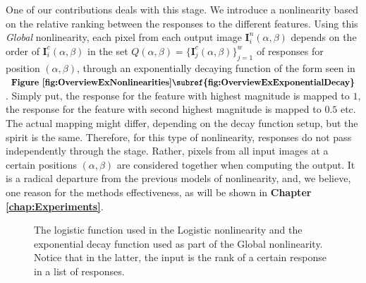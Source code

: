 \documentclass[12pt,a4paper,oneside,english]{UPBThesis}
\begin{document}
One of our contributions deals with this stage. We introduce a nonlinearity based on the relative ranking between the responses to the different features. Using this \emph{Global} nonlinearity, each pixel from each output image $\textbf{I}_i^n(\alpha,\beta)$ depends on the order of $\textbf{I}_i^c(\alpha,\beta)$ in the set $Q(\alpha,\beta) = \{\textbf{I}_j^c(\alpha,\beta)\}_{j=1}^w$ of responses for position $(\alpha,\beta)$, through an exponentially decaying function of the form seen in $\textbf{Figure \ref{fig:OverviewExNonlinearities}\subref{fig:OverviewExExponentialDecay}}$. Simply put, the response for the feature with highest magnitude is mapped to $1$, the response for the feature with second highest magnitude is mapped to $0.5$ etc. The actual mapping might differ, depending on the decay function setup, but the spirit is the same. Therefore, for this type of nonlinearity, responses do not pass independently through the stage. Rather, pixels from all input images at a certain positions $(\alpha,\beta)$ are considered together when computing the output. It is a radical departure from the previous models of nonlinearity, and, we believe, one reason for the methods effectiveness, as will be shown in \textbf{Chapter \ref{chap:Experiments}}.

\begin{figure}
\centering
{}
\caption{The logistic function used in the Logistic nonlinearity and the exponential decay function used as part of the Global nonlinearity. Notice that in the latter, the input is the rank of a certain response in a list of responses.}
\label{fig:OverviewExNonlinearities}
\end{figure}
\end{document}
